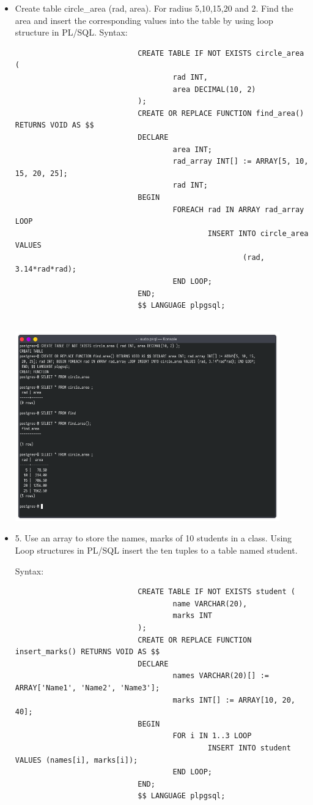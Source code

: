 \documentclass[13pt,oneside]{book}
\begin{document}
\begin{itemize}
							
							\item
							Create table circle\_area (rad, area). For radius 5,10,15,20 and 2. Find the area and
							insert the corresponding values into the table by using loop structure in PL/SQL.
							Syntax:
							\begin{verbatim}
							CREATE TABLE IF NOT EXISTS circle_area (
									rad INT,
									area DECIMAL(10, 2)
							);
							CREATE OR REPLACE FUNCTION find_area() RETURNS VOID AS $$
							DECLARE
									area INT;
									rad_array INT[] := ARRAY[5, 10, 15, 20, 25];
									rad INT;
							BEGIN
									FOREACH rad IN ARRAY rad_array LOOP
											INSERT INTO circle_area VALUES 
													(rad, 3.14*rad*rad);
									END LOOP;
							END;
							$$ LANGUAGE plpgsql;
							
							\end{verbatim}
							\includegraphics[width=0.9\textwidth]{img/p8/ss4.png}
							
							
							\item 
							 5. Use an array to store the names, marks of 10 students in a class. Using Loop
							 structures in PL/SQL insert the ten tuples to a table named student.
							 
							 
							Syntax:
							\begin{verbatim}
							CREATE TABLE IF NOT EXISTS student (
									name VARCHAR(20),
									marks INT
							);
							CREATE OR REPLACE FUNCTION insert_marks() RETURNS VOID AS $$
							DECLARE
									names VARCHAR(20)[] := ARRAY['Name1', 'Name2', 'Name3'];
									marks INT[] := ARRAY[10, 20, 40];
							BEGIN
									FOR i IN 1..3 LOOP
											INSERT INTO student VALUES (names[i], marks[i]);
									END LOOP;
							END;
							$$ LANGUAGE plpgsql;
							

\end{verbatim}
\end{itemize}
\end{document}
